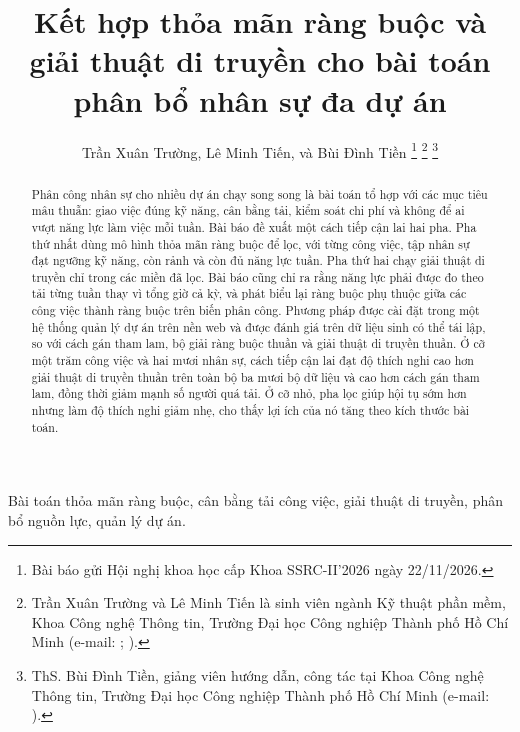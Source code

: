 \documentclass{IEEEtran}
\begin{document}
\title{Kết hợp thỏa mãn ràng buộc và giải thuật di truyền cho bài toán phân bổ nhân sự đa dự án}

\author{Trần Xuân Trường, Lê Minh Tiến, và Bùi Đình Tiền
\thanks{Bài báo gửi Hội nghị khoa học cấp Khoa SSRC-II'2026 ngày 22/11/2026.}
\thanks{Trần Xuân Trường và Lê Minh Tiến là sinh viên ngành Kỹ thuật phần mềm, Khoa Công nghệ Thông tin, Trường Đại học Công nghiệp Thành phố Hồ Chí Minh (e-mail: \underline{\hspace{3cm}}; \underline{\hspace{3cm}}).}
\thanks{ThS. Bùi Đình Tiền, giảng viên hướng dẫn, công tác tại Khoa Công nghệ Thông tin, Trường Đại học Công nghiệp Thành phố Hồ Chí Minh (e-mail: \underline{\hspace{3cm}}).}}

\maketitle

\begin{abstract}
Phân công nhân sự cho nhiều dự án chạy song song là bài toán tổ hợp với các mục tiêu mâu thuẫn: giao việc đúng kỹ năng, cân bằng tải, kiểm soát chi phí và không để ai vượt năng lực làm việc mỗi tuần. Bài báo đề xuất một cách tiếp cận lai hai pha. Pha thứ nhất dùng mô hình thỏa mãn ràng buộc để lọc, với từng công việc, tập nhân sự đạt ngưỡng kỹ năng, còn rảnh và còn đủ năng lực tuần. Pha thứ hai chạy giải thuật di truyền chỉ trong các miền đã lọc. Bài báo cũng chỉ ra rằng năng lực phải được đo theo tải từng tuần thay vì tổng giờ cả kỳ, và phát biểu lại ràng buộc phụ thuộc giữa các công việc thành ràng buộc trên biến phân công. Phương pháp được cài đặt trong một hệ thống quản lý dự án trên nền web và được đánh giá trên dữ liệu sinh có thể tái lập, so với cách gán tham lam, bộ giải ràng buộc thuần và giải thuật di truyền thuần. Ở cỡ một trăm công việc và hai mươi nhân sự, cách tiếp cận lai đạt độ thích nghi cao hơn giải thuật di truyền thuần trên toàn bộ ba mươi bộ dữ liệu và cao hơn cách gán tham lam, đồng thời giảm mạnh số người quá tải. Ở cỡ nhỏ, pha lọc giúp hội tụ sớm hơn nhưng làm độ thích nghi giảm nhẹ, cho thấy lợi ích của nó tăng theo kích thước bài toán.
\end{abstract}

\begin{IEEEkeywords}
Bài toán thỏa mãn ràng buộc, cân bằng tải công việc, giải thuật di truyền, phân bổ nguồn lực, quản lý dự án.
\end{IEEEkeywords}
\end{document}
